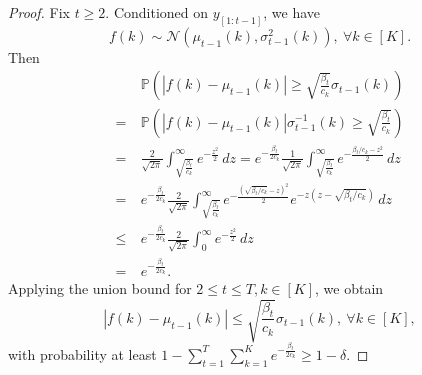 \documentclass[letterpaper]{vldb}
\newcommand{\cN}{\mathcal{N}}
\newcommand{\bP}{\mathbb{P}} %
\begin{document}
\begin{proof}
  Fix $t\ge 2$. Conditioned on $y_{[1:t-1]}$, we have
  \[
    f(k) \sim \cN(\mu_{t-1}(k), \sigma^2_{t-1}(k)), \ \forall k\in [K].
  \]
  Then
  \begin{align*}
    & \bP\left(|f(k)- \mu_{t-1}(k)| \ge \sqrt{\frac{\beta_t}{c_k}}\sigma_{t-1}(k)\right)\\
    =\ & \bP\left(|f(k)- \mu_{t-1}(k)|\sigma^{-1}_{t-1}(k) \ge \sqrt{\frac{\beta_t}{c_k}}\right)\\
    =\ & \frac{2}{\sqrt{2\pi}}\int_{\sqrt{\frac{\beta_t}{c_k}}}^\infty e^{-\frac{z^2}{2}}\, dz = e^{-\frac{\beta_t}{2c_k}} \frac{1}{\sqrt{2\pi}}\int_{\sqrt{\frac{\beta_t}{c_k}}}^\infty e^{-\frac{\beta_t/c_k-z^2}{2}}\, dz\\
    =\ & e^{-\frac{\beta_t}{2c_k}} \frac{2}{\sqrt{2\pi}}\int_{\sqrt{\frac{\beta_t}{c_k}}}^\infty e^{-\frac{(\sqrt{\beta_t/c_k}-z)^2}{2}}e^{-z(z-\sqrt{\beta_t/c_k})}\, dz\\
    \le \ & e^{-\frac{\beta_t}{2c_k}} \frac{2}{\sqrt{2\pi}} \int_0^\infty e^{-\frac{z^2}{2}}\, dz\\
    =\ & e^{-\frac{\beta_t}{2c_k}}.
  \end{align*}
  Applying the union bound for $2\le t\le T, k\in [K]$, we obtain
  \[
    |f(k) - \mu_{t-1}(k) | \le \sqrt{\frac{\beta_t}{c_k}}\sigma_{t-1}(k),\
    \forall k\in [K],
  \]
  with probability at least $1- \sum_{t=1}^T\sum_{k=1}^K
  e^{-\frac{\beta_t}{2c_k}} \ge  1 - \delta$.
\end{proof}
\end{document}

